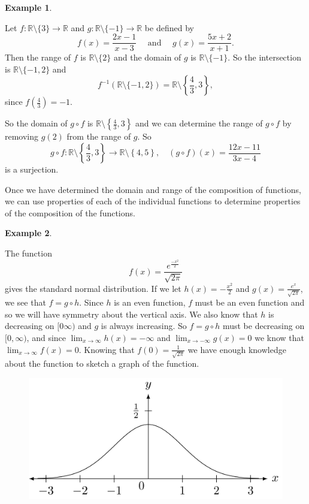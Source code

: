 \documentclass[
]{book}
\theoremstyle{definition}
\theoremstyle{definition}
\newtheorem{example}{Example}[chapter]
\theoremstyle{definition}
\theoremstyle{definition}
\theoremstyle{remark}
\begin{document}
\begin{example}
\protect\hypertarget{exm:unlabeled-div-141}{}\label{exm:unlabeled-div-141}

Let \(f:\mathbb{R}\setminus \{3\} \rightarrow \mathbb{R}\) and \(g:\mathbb{R}\setminus \{-1\} \rightarrow \mathbb{R}\) be defined by \[f(x) = \frac{2x-1}{x-3} \quad \mbox{ and } \quad g(x)=\frac{5x+2}{x+1}.\]
Then the range of \(f\) is \(\mathbb{R} \setminus \{2\}\) and the domain of \(g\) is \(\mathbb{R}\setminus \{-1\}\). So the intersection is \(\mathbb{R}\setminus \{-1,2\}\) and
\[f^{-1} \left(\mathbb{R} \setminus \{-1,2\} \right) = \mathbb{R} \setminus \left\{\frac{4}{3}, 3\right\},\] since \(f\left(\frac{4}{3}\right) = -1\).

So the domain of \(g\circ f\) is \(\mathbb{R} \setminus \left\{\frac{4}{3}, 3\right\}\) and we can determine the range of \(g\circ f\) by removing \(g(2)\) from the range of \(g\). So
\[g\circ f : \mathbb{R} \setminus \left\{\frac{4}{3}, 3\right\} \rightarrow \mathbb{R} \setminus \left\{ 4,5 \right\}, \quad (g\circ f) (x) = \frac{12x-11}{3x-4}\] is a surjection.

\end{example}

Once we have determined the domain and range of the composition of functions, we can use properties of each of the individual functions to determine properties of the composition of the functions.

\begin{example}
\protect\hypertarget{exm:unlabeled-div-142}{}\label{exm:unlabeled-div-142}

The function
\[f(x) = \frac{e^{\frac{-x^2}{2}}}{\sqrt{2\pi}}\] gives the standard normal distribution. If we let \(h(x)=-\frac{x^2}{2}\) and \(g(x)=\frac{e^x}{\sqrt{2\pi}}\), we see that \(f=g\circ h\). Since \(h\) is an even function, \(f\) must be an even function and so we will have symmetry about the vertical axis. We also know that \(h\) is decreasing on \([0\infty)\) and \(g\) is always increasing. So \(f=g\circ h\) must be decreasing on \([0,\infty)\), and since \(\lim_{x\rightarrow \infty} h(x) = -\infty\) and \(\lim_{x\rightarrow -\infty} g(x) = 0\) we know that \(\lim_{x\rightarrow \infty} f(x) = 0\). Knowing that \(f(0)=\frac{1}{\sqrt{2\pi}}\) we have enough knowledge about the function to sketch a graph of the function.

\begin{figure}

{\centering \includegraphics[width=0.5\linewidth]{tikz/normal-distribution} 

}

\end{figure}

\end{example}
\end{document}
